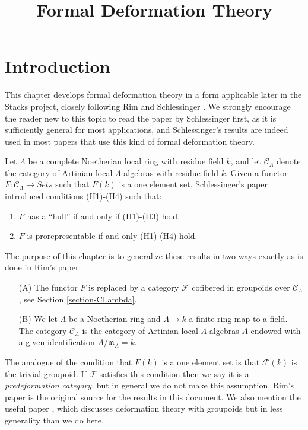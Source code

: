 


%


\title{Formal Deformation Theory}


\maketitle

\label{section-phantom}

\tableofcontents



\section{Introduction}
\label{section-introduction}

\noindent
This chapter develops formal deformation theory in a form applicable
later in the Stacks project, closely following Rim \cite[Exposee VI]{SGA7-I}
and Schlessinger \cite{Sch}. We strongly encourage the reader new to
this topic to read the paper by Schlessinger first, as it is sufficiently
general for most applications, and Schlessinger's results are indeed
used in most papers that use this kind of formal deformation theory.

\medskip\noindent
Let $\Lambda$ be a complete Noetherian local ring with residue field $k$,
and let $\mathcal{C}_\Lambda$ denote the category of Artinian local
$\Lambda$-algebras with residue field $k$. Given a functor
$F : \mathcal{C}_\Lambda \to \textit{Sets}$ such that $F(k)$
is a one element set, Schlessinger's paper introduced conditions
(H1)-(H4) such that:
\begin{enumerate}
\item $F$ has a ``hull'' if and only if (H1)-(H3) hold.
\item $F$ is prorepresentable if and only (H1)-(H4) hold.
\end{enumerate}
The purpose of this chapter is to generalize these results in two ways
exactly as is done in Rim's paper:
\begin{enumerate}
\item[(A)] The functor $F$ is replaced by a category $\mathcal{F}$ cofibered
in groupoids over $\mathcal{C}_\Lambda$, see
Section \ref{section-CLambda}.
\item[(B)] We let $\Lambda$ be a Noetherian ring and $\Lambda \to k$
a finite ring map to a field. The category $\mathcal{C}_\Lambda$ is
the category of Artinian local $\Lambda$-algebras $A$ endowed with a
given identification $A/\mathfrak m_A = k$.
\end{enumerate}
The analogue of the condition that $F(k)$ is a  one element set is that
$\mathcal{F}(k)$ is the trivial groupoid. If $\mathcal{F}$ satisfies this
condition then we say it is a {\it predeformation category}, but in  general
we do not make this assumption.  Rim's paper \cite[Exposee VI]{SGA7-I} is the
original source for the results in this document. We also mention the useful
paper \cite{Talpo-Vistoli}, which discusses deformation theory with groupoids
but in less generality than we do here.

